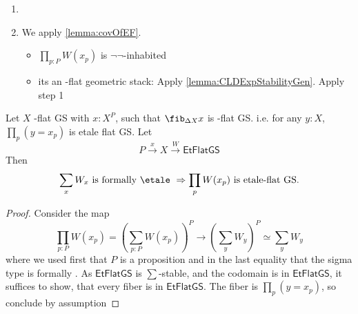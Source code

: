 \begin{enumerate}
	\item 
	\item 
	We apply \ref{lemma:covOfEF}.
	\begin{itemize}
		\item 	$\prod_{p : P} W (x_p)$ is $\lnot \lnot$-inhabited
		\item  its an \etale-flat geometric stack: Apply \ref{lemma:CLDExpStabilityGen}. Apply step 1
		
		
		
	\end{itemize}
\end{enumerate}
\begin{lemma}{\label{lemma:CLDExpStabilityGen}}
	Let  $X$ \etale-flat GS with $x : X^P$, such that $\fib_{\Delta X} x$ is \etale-flat GS. i.e. for any $y : X$, $\prod_p (y = x_p)$ is etale flat GS.
	Let \[P \overset{x}{\to} X \overset{W}{\to} \mathsf{EtFlatGS}\]
	Then 
	\[ \sum_x W_x \text{ is formally \etale } \Rightarrow \prod_p W(x_p) \text {  is etale-flat GS.}\]
\end{lemma}
\begin{proof}
	
	Consider the map 
	\[
	\prod_{p: P} W(x_p) = (\sum_{p : P} W(x_p))^P \to (\sum_y W_y)^P \simeq \sum_y W_y
	\]
	where we used first that $P$ is a proposition and in the last equality that the sigma type is formally \etale.
	As $\mathsf{EtFlatGS}$ is $\sum$-stable, and the codomain is in $\mathsf{EtFlatGS}$, it suffices to show, that every fiber is in $\mathsf{EtFlatGS}$. The fiber is $\prod_p (y = x_p)$, so conclude by assumption
\end{proof}


